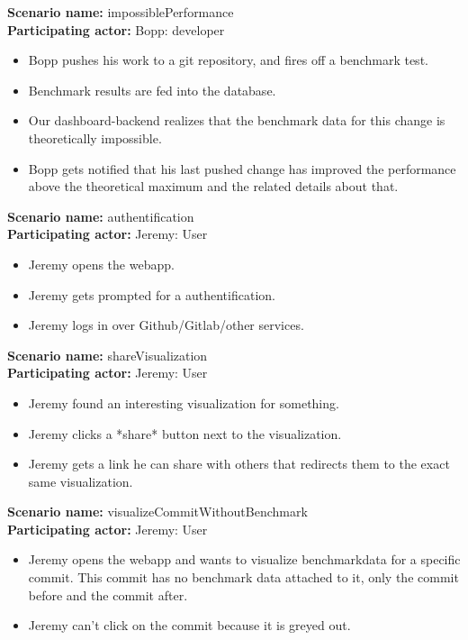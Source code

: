 \documentclass[parskip=full,11pt]{scrartcl}
\begin{document}
\textbf{Scenario name:} impossiblePerformance \\
\textbf{Participating actor:} Bopp: \gls{developer}
\begin{itemize}
	\item Bopp pushes his work to a git repository, and fires off a benchmark test.
	\item Benchmark results are fed into the database.
	\item Our dashboard-backend realizes that the benchmark data for this change is theoretically impossible.
	\item Bopp gets notified that his last pushed change has improved the performance above the theoretical maximum and the related details about that.
\end{itemize}

\textbf{Scenario name:} authentification \\
\textbf{Participating actor:} Jeremy: User
\begin{itemize}
	\item Jeremy opens the webapp.
	\item Jeremy gets prompted for a authentification.
	\item Jeremy logs in over Github/Gitlab/other services.
\end{itemize}

\textbf{Scenario name:} shareVisualization \\
\textbf{Participating actor:} Jeremy: User
\begin{itemize}
	\item Jeremy found an interesting visualization for something.
	\item Jeremy clicks a *share* button next to the visualization.
	\item Jeremy gets a link he can share with others that redirects them to the exact same visualization.
\end{itemize}

\textbf{Scenario name:} visualizeCommitWithoutBenchmark \\
\textbf{Participating actor:} Jeremy: User
\begin{itemize}
	\item Jeremy opens the webapp and wants to visualize benchmarkdata for a specific commit. This commit has no benchmark data attached to it, only the commit before and the commit after.
	\item Jeremy can't click on the commit because it is greyed out.
\end{itemize}
\end{document}
